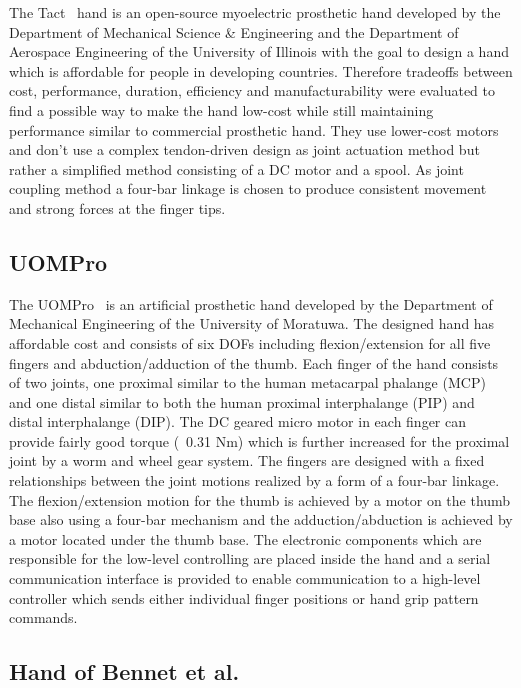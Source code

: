\documentclass[a4paper, 10pt, conference]{ieeeconf}      %
\begin{document}
The Tact~\cite{tact} hand is an open-source myoelectric prosthetic hand developed by the Department of Mechanical Science \& Engineering and the Department of Aerospace Engineering of the University of Illinois with the goal to design a hand which is affordable for people in developing countries. Therefore tradeoffs between cost, performance, duration, efficiency and manufacturability were evaluated to find a possible way to make the hand low-cost while still maintaining performance similar to commercial prosthetic hand. They use lower-cost motors and don't use a complex tendon-driven design as joint actuation method but rather a simplified method consisting of a DC motor and a spool. As joint coupling method a four-bar linkage is chosen to produce consistent movement and strong forces at the finger tips.

\subsection{UOMPro}

The UOMPro~\cite{uompro} is an artificial prosthetic hand developed by the Department of Mechanical Engineering of the University of Moratuwa. The designed hand has affordable cost and consists of six DOFs including flexion/extension for all five fingers and abduction/adduction of the thumb. Each finger of the hand consists of two joints, one proximal similar to the human metacarpal phalange (MCP) and one distal similar to both the human proximal interphalange (PIP) and distal interphalange (DIP). The DC geared micro motor in each finger can provide fairly good torque (~0.31 Nm) which is further increased for the proximal joint by a worm and wheel gear system. The fingers are designed with a fixed relationships between the joint motions realized by a form of a four-bar linkage. The flexion/extension motion for the thumb is achieved by a motor on the thumb base also using a four-bar mechanism and the adduction/abduction is achieved by a motor located under the thumb base. The electronic components which are responsible for the low-level controlling are placed inside the hand and a serial communication interface is provided to enable communication to a high-level controller which sends either individual finger positions or hand grip pattern commands.

\subsection{Hand of Bennet et al.}
\end{document}
